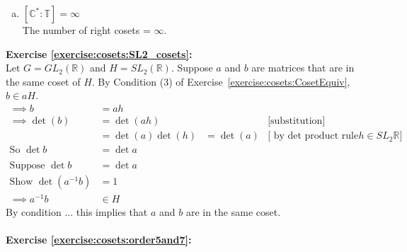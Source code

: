 \begin{enumerate}[(a)]
\item
$[ {\mathbb C}^\ast : {\mathbb T} ] = \infty$
\\
The number of right cosets = $\infty$.

\end{enumerate}

\noindent\textbf{Exercise \ref{exercise:cosets:SL2_cosets}:}
\\
Let $G = GL_2({\mathbb R})$  and $H = SL_2({\mathbb R})$. Suppose $a$ and $b$ are matrices that are in the same coset of $H$.  By Condition (3) of Exercise~\ref{exercise:cosets:CosetEquiv}, $b \in aH$. 
\begin{align*}
\implies b &= ah
\\
\implies \det(b) &= \det(ah)  & &\text{[substitution]}
\\
&= \det(a)\det(h) &= \det(a)  &\text{[ by det product rule and\ } h \in SL_2{\mathbb R} ]
\\
\text{So\ } \det b &= \det a
\\
\\
\text{Suppose\ } \det b &= \det a
\\
\text{Show\ } \det(a^{-1} b) &= 1
\\
\implies a^{-1}b &\in H
\end{align*}
By condition ... this implies that $a$ and $b$ are in the same coset.
\\
\\
\noindent\textbf{Exercise \ref{exercise:cosets:order5and7}:}
%
